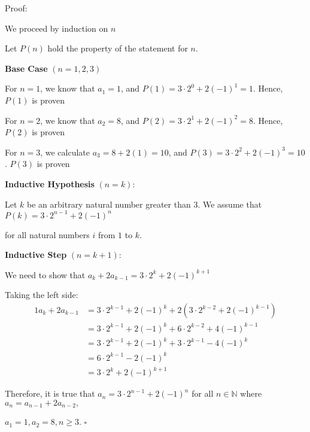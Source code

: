 \documentclass{article} %
\begin{document}
    Proof:

    We proceed by induction on $n$

    Let $P(n)$ hold the property of the statement for $n$.

    \textbf{Base Case} $(n = 1, 2, 3)$

    For $n = 1$, we know that $a_1 = 1$, and $P(1) = 3 \cdot 2^0 + 2(-1)^1 = 1$. Hence, $P(1)$ is proven

    For $n = 2$, we know that $a_2 = 8$, and $P(2) = 3 \cdot 2^1 + 2(-1)^2 = 8$. Hence, $P(2)$ is proven

    For $n = 3$, we calculate $a_3 = 8 + 2(1) = 10$, and $P(3) = 3 \cdot 2^2 + 2(-1)^3 = 10$. $P(3)$ is proven

    \textbf{Inductive Hypothesis} $(n = k)$:

    Let $k$ be an arbitrary natural number greater than 3. We assume that $P(k) = 3 \cdot 2^{n - 1} + 2(-1)^n$

    for all natural numbers $i$ from $1$ to $k$.

    \textbf{Inductive Step} $(n = k + 1)$:

    We need to show that $a_{k} + 2a_{k - 1} = 3 \cdot 2^{k} + 2(-1)^{k + 1}$

    Taking the left side:
    \begin{alignat*}{1}
        a_{k} + 2a_{k - 1} &= 3 \cdot 2^{k - 1} + 2(-1)^k + 2(3 \cdot 2^{k - 2} + 2(-1)^{k - 1})\\
        &= 3 \cdot 2^{k - 1} + 2(-1)^k + 6 \cdot 2^{k - 2} + 4(-1)^{k - 1}\\
        &= 3 \cdot 2^{k - 1} + 2(-1)^{k} + 3 \cdot 2^{k - 1} - 4(-1)^{k}\\
        &= 6 \cdot 2^{k - 1} - 2(-1)^{k}\\
        &= 3 \cdot 2^{k} + 2(-1)^{k + 1}
    \end{alignat*}

    Therefore, it is true that $a_n = 3 \cdot 2^{n - 1} + 2(-1)^n$ for all $n \in \mathbb{N}$ where $a_n = a_{n - 1} + 2a_{n-2},$
    
    $a_1 = 1, a_2 = 8, n \geq 3$. $\square$

    \newpage

                                                                   
\end{document}
